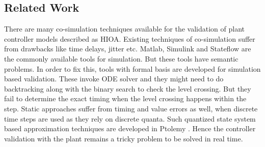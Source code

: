 \subsection{Related Work}
There are many co-simulation techniques available for the validation of plant controller models described as HIOA. Existing techniques of co-simulation \citep{Zhabelova2012} suffer from drawbacks \citep{Carlsson2012} \citep{Freund2002} like time delays, jitter etc. Matlab, Simulink \citep{Simulink1993} and Stateflow \citep{Alur2008} are the commonly available tools for simulation. But these tools have semantic problems. In order to fix this, tools with formal basis \citep{Ptolemaeus2014} are developed for simulation based validation. These invoke ODE solver and they might need to do backtracking along with the binary search to check the level crossing. But they fail to determine the exact timing when the level crossing happens within the step. Static approaches suffer from timing and value errors as well, when discrete time steps are used as they rely on discrete quanta. Such quantized state system based approximation techniques are developed in Ptolemy \citep{brooks2015cyphysim}. Hence the controller validation with the plant remains a tricky problem to be solved in real time.


